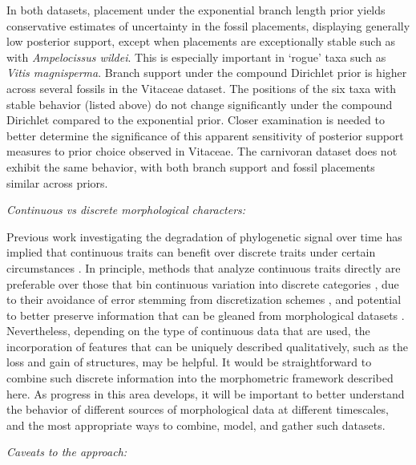 \documentclass[12pt]{article}
\begin{document}
In both datasets, placement under the exponential branch length prior
yields conservative estimates of uncertainty in the fossil placements,
displaying generally low posterior support, except when placements are
exceptionally stable such as with \emph{Ampelocissus wildei}. This is
especially important in `rogue' taxa such as \emph{Vitis magnisperma}.
Branch support under the compound Dirichlet prior is higher across several fossils in the Vitaceae dataset. The
positions of the six taxa with stable behavior (listed above) do not
change significantly under the compound Dirichlet compared to the
exponential prior. Closer examination is needed to better determine the
significance of this apparent sensitivity of posterior support measures to prior choice observed in
Vitaceae. The carnivoran dataset does not exhibit the same behavior,
with both branch support and fossil placements similar across priors.

\noindent\emph{Continuous vs discrete morphological characters:}

Previous work investigating the degradation of phylogenetic signal over time has implied that continuous traits can benefit over discrete traits under certain circumstances \citep{revell2008phylogenetic}. In principle, methods that analyze continuous traits directly are preferable over those that bin continuous variation into discrete categories \citep{goloboff2006continuous}, due to their avoidance of error stemming from discretization schemes \citep{rae1998logical}, and potential to better preserve information that can be gleaned from morphological datasets \citep{parins2017use}. Nevertheless, depending on the type of continuous data that are used, the incorporation of  features that can be uniquely described qualitatively, such as the loss and gain of structures, may be helpful. It would be straightforward to combine such discrete information into the morphometric framework described here. As progress in this area develops, it will be important to better understand the behavior of different sources of morphological data at different timescales, and the most appropriate ways to combine, model, and gather such datasets.

\noindent\emph{Caveats to the approach:}
\end{document}
